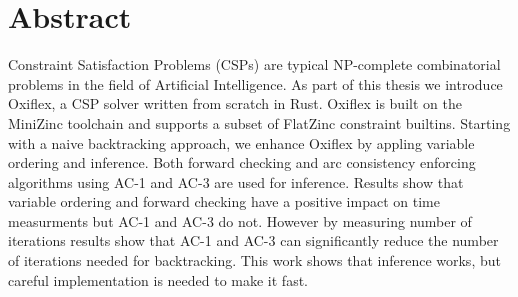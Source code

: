 
\chapter*{Abstract}

Constraint Satisfaction Problems (CSPs) are typical NP-complete combinatorial problems in the field of Artificial Intelligence. As part of this thesis we introduce Oxiflex, a CSP solver written from scratch in Rust. Oxiflex is built on the MiniZinc toolchain and supports a subset of FlatZinc constraint builtins. Starting with a naive backtracking approach, we enhance Oxiflex by appling variable ordering and inference. Both forward checking and arc consistency enforcing algorithms using AC-1 and AC-3 are used for inference. Results show that variable ordering and forward checking have a positive impact on time measurments but AC-1 and AC-3 do not. However by measuring number of iterations results show that AC-1 and AC-3 can significantly reduce the number of iterations needed for backtracking. This work shows that inference works, but careful implementation is needed to make it fast.

